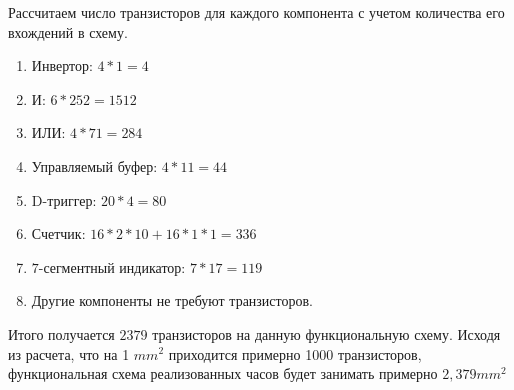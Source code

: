 \documentclass[10pt,a4paper,final]{article} %
\begin{document}
Рассчитаем число транзисторов для каждого компонента с учетом количества его вхождений в схему.
\begin{enumerate}[label=]
	\item $\text{Инвертор: } 4 * 1 = 4$ 
	\item $\text{И: }  6 * 252 = 1512$
	\item $\text{ИЛИ: }  4 * 71 = 284$
	\item $\text{Управляемый буфер: }  4 * 11 = 44$
	\item $\text{D-триггер: }  20 * 4 = 80$
	\item $\text{Счетчик: }  16 * 2 * 10 + 16 * 1 * 1 = 336$
	\item $\text{7-сегментный индикатор: }  7 * 17 = 119$
	\item Другие компоненты не требуют транзисторов.
\end{enumerate}
Итого получается  $2379$ транзисторов на данную функциональную схему. Исходя из расчета, что на 1 $mm^2$ приходится примерно 1000 транзисторов, функциональная схема реализованных часов будет занимать примерно $2,379mm^2$


\newpage
{}
\end{document}
